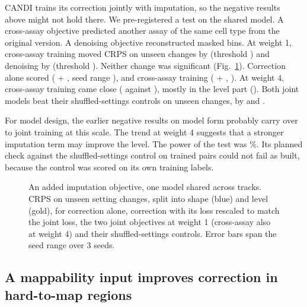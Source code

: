 \documentclass[pdflatex,sn-mathphys-num]{sn-jnl}
\newcommand{\lit}[1]{#1}
\begin{document}
CANDI trains its correction jointly with imputation, so the negative results above might not
hold there. We pre-registered a test on the shared model. A cross-assay objective predicted
another assay of the same cell type from the original version. A denoising objective
reconstructed masked bins. At weight \lit{1}, cross-assay training moved CRPS on unseen changes
by \jXd{} (threshold \jXdBar{}) and denoising by \jDnd{} (threshold \jDndBar{}). Neither change
was significant (Fig.~\ref{fig:joint}). Correction alone scored \jAlone{} (\jAloneOS{} +
\jAloneSE{}, seed range \jAloneS{}), and cross-assay training \jX{} (\jXOS{} + \jXSE{}, \jXS{}).
At weight \lit{4}, cross-assay training came close (\jXfourd{} against \jXfourdBar{}), mostly
in the level part (\jXfourdSE{}). Both joint models beat their shuffled-settings controls on
unseen changes, by \jXtw{} and \jDntw{}.

For model design, the earlier negative results on model form probably carry over to joint
training at this scale. The trend at weight \lit{4} suggests that a stronger imputation term may
improve the level. The power of the test was \powJoint\%. Its planned check against the
shuffled-settings control on trained pairs could not fail as built, because the control was
scored on its own training labels.

\begin{figure}[t]
\centering
{}
\caption{An added imputation objective, one model shared across tracks. CRPS on unseen
setting changes, split into shape (blue) and level (gold), for correction alone, correction
with its loss rescaled to match the joint loss, the two joint objectives at weight \lit{1}
(cross-assay also at weight \lit{4}) and their shuffled-settings controls. Error bars span the
seed range over \lit{3} seeds.}\label{fig:joint}
\end{figure}

\subsection{A mappability input improves correction in hard-to-map regions}\label{sec:r11}
\end{document}
